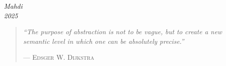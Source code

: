 \vfill

\begin{flushright}
	\textit{Mahdi} \\
	\textit{2025} \\
\end{flushright}

\vspace{2em}

\begin{quote}
	\textit{``The purpose of abstraction is not to be vague, but to create a new semantic level in which one can be absolutely precise.''}
	
	\hfill--- \textsc{Edsger W. Dijkstra}
\end{quote}

\clearpage